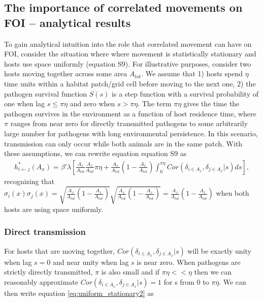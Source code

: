 \documentclass[letterpaper]{article}
\begin{document}
\subsection*{The importance of correlated movements on FOI -- analytical results}

To gain analytical intuition into the role that correlated movement can have on FOI, consider the situation where where movement is statistically stationary and hosts use space uniformly (equation S9). 
For illustrative purposes, consider two hosts moving together across some area $A_{tot}$. We assume that 1) hosts spend $\eta$ time units within a habitat patch/grid cell before moving to the next one, 2) the pathogen survival function $S(s)$ is a step function with a survival probability of one when lag $s \leq \pi \eta$ and zero when $s > \pi \eta$.  
The term $\pi \eta$ gives the time the pathogen survives in the environment as a function of host residence time, where $\pi$ ranges from near zero for directly transmitted pathogens to some arbitrarily large number for pathogens with long environmental persistence.  
In this scenario, transmission can only occur while both animals are in the same patch. With these assumptions, we can rewrite equation equation S9 as 
\begin{equation}
    \begin{aligned}
        h^*_{i \leftarrow j}(A_x) = \beta' \lambda \left[\frac{A_x}{A_{tot}}\frac{A_x}{A_{tot}} \pi \eta + \frac{A_x}{A_{tot}}(1 - \frac{A_x}{A_{tot}}) \int_{0}^{\pi \eta} Cor(\delta_{i \in A_x}, \delta_{j \in A_x} | s) ds\right],
    \end{aligned}
    \label{eq:uniform_stationary2}
\end{equation}
recognizing that $\sigma_i(x) \sigma_j(x) = \sqrt{\frac{A_x}{A_{tot}}(1 - \frac{A_x}{A_{tot}})}\sqrt{\frac{A_x}{A_{tot}}(1 - \frac{A_x}{A_{tot}})} = \frac{A_x}{A_{tot}}(1 - \frac{A_x}{A_{tot}})$ when both hosts are using space uniformly.

\subsubsection*{Direct transmission}

For hosts that are moving together, $Cor(\delta_{i \in A_x}, \delta_{j \in A_x} | s)$ will be exactly unity when lag $s = 0$ and near unity when lag $s$ is near zero. When pathogens are strictly directly transmitted, $\pi$ is also small and if $\pi \eta << \eta$ then we can reasonably approximate $Cor(\delta_{i \in A_x}, \delta_{j \in A_x} | s) = 1$ for s from 0 to $\pi \eta$.  We can then write equation \ref{eq:uniform_stationary2} as 
\end{document}
